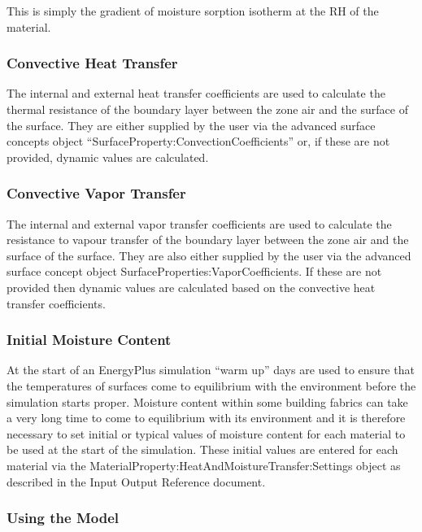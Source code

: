 This is simply the gradient of moisture sorption isotherm at the RH of the
material.

\subsubsection{Convective Heat Transfer}\label{convective-heat-transfer}

The internal and external heat transfer coefficients are used to calculate
the thermal resistance of the boundary layer between the zone air and the
surface of the surface. They are either supplied by the user via the
advanced surface concepts object ``SurfaceProperty:ConvectionCoefficients''
or, if these are not provided, dynamic values are calculated.

\subsubsection{Convective Vapor Transfer}\label{convective-vapor-transfer}

The internal and external vapor transfer coefficients are used to calculate
the resistance to vapour transfer of the boundary layer between the zone
air and the surface of the surface. They are also either supplied by the
user via the advanced surface concept object
SurfaceProperties:VaporCoefficients. If these are not provided then dynamic
values are calculated based on the convective heat transfer coefficients.

\subsubsection{Initial Moisture Content}\label{initial-moisture-content}

At the start of an EnergyPlus simulation ``warm up'' days are used to
ensure that the temperatures of surfaces come to equilibrium with the
environment before the simulation starts proper. Moisture content within
some building fabrics can take a very long time to come to equilibrium with
its environment and it is therefore necessary to set initial or typical
values of moisture content for each material to be used at the start of the
simulation. These initial values are entered for each material via the
MaterialProperty:HeatAndMoistureTransfer:Settings object as described in
the Input Output Reference document.

\subsubsection{Using the Model}\label{using-the-model}

